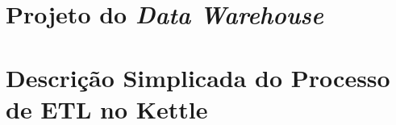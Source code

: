 \begin{apendicesenv}

\chapter{Projeto do \textit{Data Warehouse}}
\label{project-dw}





\chapter{Descrição Simplicada do Processo de ETL no Kettle}

\label{implementação}


\end{apendicesenv}
